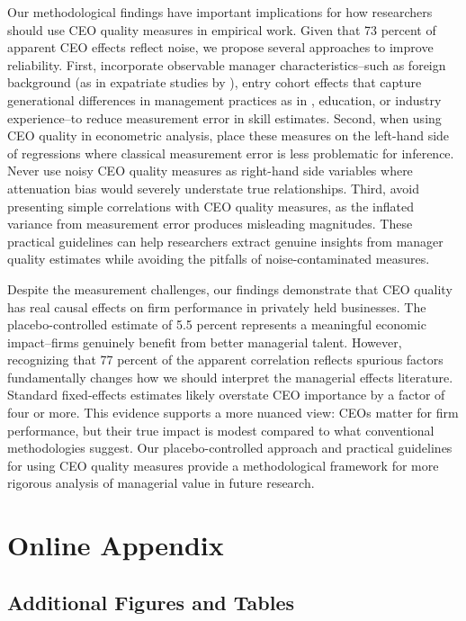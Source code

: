 \documentclass[11pt,a4paper]{article}
\begin{document}
Our methodological findings have important implications for how researchers should use CEO quality measures in empirical work. Given that 73 percent of apparent CEO effects reflect noise, we propose several approaches to improve reliability. First, incorporate observable manager characteristics\---such as foreign background (as in expatriate studies by \citet{Koren2023expat}), entry cohort effects that capture generational differences in management practices as in \citet{koren2024managers}, education, or industry experience\---to reduce measurement error in skill estimates. Second, when using CEO quality in econometric analysis, place these measures on the left-hand side of regressions where classical measurement error is less problematic for inference. Never use noisy CEO quality measures as right-hand side variables where attenuation bias would severely understate true relationships. Third, avoid presenting simple correlations with CEO quality measures, as the inflated variance from measurement error produces misleading magnitudes. These practical guidelines can help researchers extract genuine insights from manager quality estimates while avoiding the pitfalls of noise-contaminated measures.

Despite the measurement challenges, our findings demonstrate that CEO quality has real causal effects on firm performance in privately held businesses. The placebo-controlled estimate of 5.5 percent represents a meaningful economic impact\---firms genuinely benefit from better managerial talent. However, recognizing that 77 percent of the apparent correlation reflects spurious factors fundamentally changes how we should interpret the managerial effects literature. Standard fixed-effects estimates likely overstate CEO importance by a factor of four or more. This evidence supports a more nuanced view: CEOs matter for firm performance, but their true impact is modest compared to what conventional methodologies suggest. Our placebo-controlled approach and practical guidelines for using CEO quality measures provide a methodological framework for more rigorous analysis of managerial value in future research.





\appendix
\section{Online Appendix}

\subsection{Additional Figures and Tables}
\end{document}
